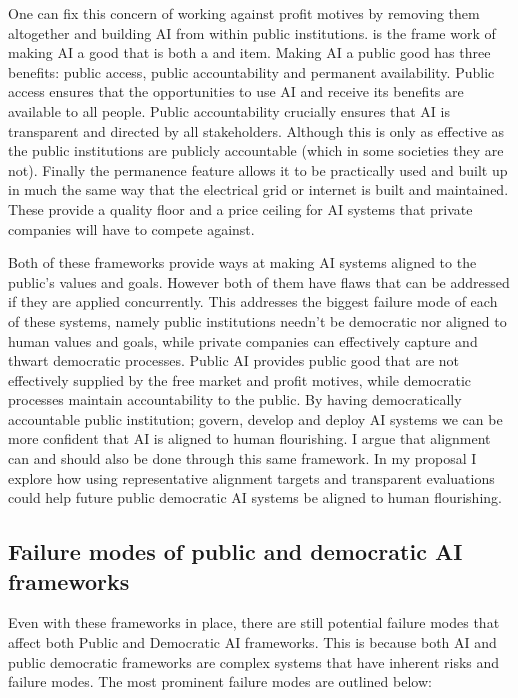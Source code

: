 One can fix this concern of working against profit motives by removing them altogether and building AI from within public institutions.  \cite{publicaiPublicAIWhite2024} is the frame work of making AI a good that is both a  and  item. Making AI a public good has three benefits: public access, public accountability and permanent availability. Public access ensures that the opportunities to use AI and receive its benefits are available to all people. Public accountability crucially ensures that AI is transparent and directed by all stakeholders. Although this is only as effective as the public institutions are publicly accountable (which in some societies they are not). Finally the permanence feature allows it to be practically used and built up in much the same way that the electrical grid or internet is built and maintained. These provide a quality floor and a price ceiling for AI systems that private companies will have to compete against.

Both of these frameworks provide ways at making AI systems aligned to the public's values and goals. However both of them have flaws that can be addressed if they are applied concurrently. This addresses the biggest failure mode of each of these systems, namely public institutions needn't be democratic nor aligned to human values and goals, while private companies can effectively capture and thwart democratic processes. Public AI provides public good that are not effectively supplied by the free market and profit motives, while democratic processes maintain accountability to the public. By having democratically accountable public institution; govern, develop and deploy AI systems we can be more confident that AI is aligned to human flourishing. I argue that alignment can and should also be done through this same framework. In my proposal I explore how using representative alignment targets and transparent evaluations could help future public democratic AI systems be aligned to human flourishing.

\subsection{Failure modes of public and democratic AI frameworks}

Even with these frameworks in place, there are still potential failure modes that affect both Public and Democratic AI frameworks. This is because both AI and public democratic frameworks are complex systems that have inherent risks and failure modes. The most prominent failure modes are outlined below:

